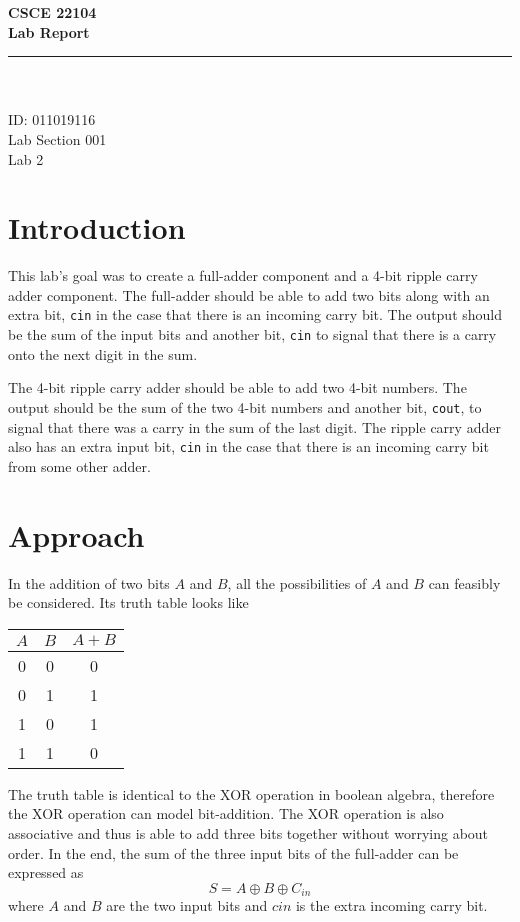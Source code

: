 \documentclass[11pt]{report}
\makeatletter
\newcommand{\@labsection}{000}
\newcommand{\labsection}[1]{
    \renewcommand{\@labsection}{#1}
}
\newcommand{\@labnumber}{0}
\newcommand{\labnumber}[1]{
    \renewcommand{\@labnumber}{#1}
}
\newcommand{\@shortsubmitted}{1/1/70}
\newcommand{\shortsubmitted}[1]{
    \renewcommand{\@shortsubmitted}{#1}
}
\renewcommand{\maketitle}{
    \newgeometry{left=1in, right=1in, top=1.75in, textheight=8.25in}
    \singlespacing
    \begin{center}
        {\huge \bf CSCE 22104} \\
        \vspace{2.5em}
        {\Large \bf Lab Report} \\
        \vspace{2em}
        \noindent\rule{20em}{0.4pt} \\
        \vspace{1em}
        {\Large \@author} \\
        \vspace{.75em}
        {\normalsize ID: 011019116} \\
        \vspace{.75em}
        {\normalsize Lab Section \@labsection} \\
        \vspace{.75em}
        {\normalsize Lab \@labnumber}
    \end{center}
    \newpage
    \restoregeometry
}
\newcommand*{\xor}{\oplus}
\makeatother
\begin{document}
\author{Brent Marcus Orlina}

\labsection{001}
\labnumber{2}

\shortsubmitted{2/5/25}

\maketitle

\section*{Introduction}
This lab's goal was to create a full-adder component and a 4-bit ripple carry adder component. The
full-adder should be able to add two bits along with an extra bit, \verb|cin| in the case that
there is an incoming carry bit. The output should be the sum of the input bits and another bit,
\verb|cin| to signal that there is a carry onto the next digit in the sum.

The 4-bit ripple carry adder should be able to add two 4-bit numbers. The output should be the sum
of the two 4-bit numbers and another bit, \verb|cout|, to signal that there was a carry in the sum
of the last digit. The ripple carry adder also has an extra input bit, \verb|cin| in the case that
there is an incoming carry bit from some other adder.

\section*{Approach}
In the addition of two bits $A$ and $B$, all the possibilities of $A$ and $B$ can feasibly be
considered. Its truth table looks like
\begin{center}
\begin{tabular}{ |c|c|c| } 
 \hline
 $A$ & $B$ & $A + B$ \\ 
 \hline
 0 & 0 & 0 \\ 
 0 & 1 & 1 \\ 
 1 & 0 & 1 \\ 
 1 & 1 & 0 \\ 
 \hline
\end{tabular}
\end{center}

The truth table is identical to the XOR operation in boolean algebra, therefore the XOR operation
can model bit-addition. The XOR operation is also associative and thus is able to add three bits
together without worrying about order. In the end, the sum of the three input bits of the full-adder
can be expressed as
\begin{equation}
    S = A \xor B \xor C_{in} \label{eq:sum}
\end{equation}
where $A$ and $B$ are the two input bits and $cin$ is the extra incoming carry bit.
\end{document}
